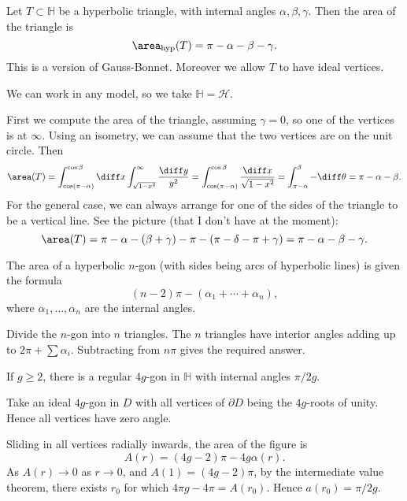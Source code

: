 \documentclass[12pt]{article}
\begin{document}
Let $T \subset \mathbb{H}$ be a hyperbolic triangle, with internal angles $\alpha, \beta, \gamma$. Then the area of the triangle is
\[
	\area_\mathrm{hyp}(T) = \pi - \alpha - \beta - \gamma.
\]
This is a version of Gauss-Bonnet. Moreover we allow $T$ to have ideal vertices.

\begin{proofbox}%
	We can work in any model, so we take $\mathbb{H} = \mathcal{H}$.

	First we compute the area of the triangle, assuming $\gamma = 0$, so one of the vertices is at $\infty$. Using an isometry, we can assume that the two vertices are on the unit circle. Then
	\[
		\area(T) = \int_{\cos(\pi-\alpha)}^{\cos \beta} \diff x \int_{\sqrt{1-x^2}}^{\infty} \frac{\diff y}{y^2} = \int_{\cos(\pi - \alpha)}^{\cos \beta} \frac{\diff x}{\sqrt{1-x^2}} = \int_{\pi - \alpha}^{\beta} - \diff \theta = \pi - \alpha - \beta.
	\]
	For the general case, we can always arrange for one of the sides of the triangle to be a vertical line. See the picture (that I don't have at the moment):
	\[
	\area(T) = \pi - \alpha - (\beta + \gamma) - \pi - (\pi - \delta - \pi + \gamma) = \pi - \alpha - \beta - \gamma.
	\]
\end{proofbox}

\begin{corollary}
	The area of a hyperbolic $n$-gon (with sides being arcs of hyperbolic lines) is given the formula
	\[
		(n-2)\pi - (\alpha_1 + \cdots + \alpha_n),
	\]
	where $\alpha_1, \ldots, \alpha_n$ are the internal angles.
\end{corollary}

\begin{proofbox}
	Divide the $n$-gon into $n$ triangles. The $n$ triangles have interior angles adding up to $2 \pi + \sum \alpha_i$. Subtracting from $n\pi$ gives the required answer.
\end{proofbox}

\begin{lemma}
	If $g \ge 2$, there is a regular $4g$-gon in $\mathbb{H}$ with internal angles $\pi/2g$.
\end{lemma}

\begin{proofbox}
	Take an ideal $4g$-gon in $D$ with all vertices of $\partial D$ being the $4g$-roots of unity. Hence all vertices have zero angle.

	Sliding in all vertices radially inwards, the area of the figure is
	\[
		A(r) = (4g - 2)\pi - 4g \alpha(r).
	\]
	As $A(r) \to 0$ as $r \to 0$, and $A(1) = (4g-2)\pi$, by the intermediate value theorem, there exists $r_0$ for which $4\pi g - 4 \pi = A(r_0)$. Hence $a(r_0) = \pi/2g$.
\end{proofbox}
\end{document}
